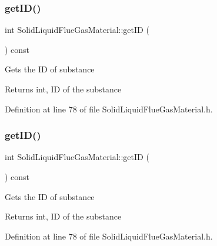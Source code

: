 \subsubsection{\texorpdfstring{get\+I\+D()}{getID()}\hspace{0.1cm}{\footnotesize\ttfamily [2/3]}}
{\footnotesize\ttfamily int Solid\+Liquid\+Flue\+Gas\+Material\+::get\+ID (\begin{DoxyParamCaption}{ }\end{DoxyParamCaption}) const\hspace{0.3cm}{\ttfamily [inline]}}

Gets the ID of substance \begin{DoxyReturn}{Returns}
int, ID of the substance 
\end{DoxyReturn}


Definition at line 78 of file Solid\+Liquid\+Flue\+Gas\+Material.\+h.

\mbox{\label{class_solid_liquid_flue_gas_material_afb124b546137da7ba99e31616198e0c8}} 
\subsubsection{\texorpdfstring{get\+I\+D()}{getID()}\hspace{0.1cm}{\footnotesize\ttfamily [3/3]}}
{\footnotesize\ttfamily int Solid\+Liquid\+Flue\+Gas\+Material\+::get\+ID (\begin{DoxyParamCaption}{ }\end{DoxyParamCaption}) const\hspace{0.3cm}{\ttfamily [inline]}}

Gets the ID of substance \begin{DoxyReturn}{Returns}
int, ID of the substance 
\end{DoxyReturn}


Definition at line 78 of file Solid\+Liquid\+Flue\+Gas\+Material.\+h.

\mbox{\label{class_solid_liquid_flue_gas_material_a0549b32b7b5423267d5f59cc96b98127}} 
